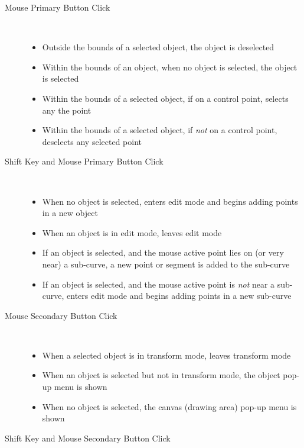 		\begin{description}
		  \item[Mouse Primary Button Click] \hfill \\
		    \begin{itemize}
		      \item Outside the bounds of a selected object, the
		        object is deselected
		      \item Within the bounds of an object, when no object
		        is selected, the object is selected
		      \item Within the bounds of a selected object,
		        if on a control point, selects any the point
		      \item Within the bounds of a selected object,
		        if \emph{not} on a control point,
		        deselects any selected point
		    \end{itemize}
		  \item[Shift Key and Mouse Primary Button Click] \hfill \\
		    \begin{itemize}
		      \item When no
		        object is selected, enters edit mode and
		        begins adding points in a
		        new object
		      \item When an
		        object is in edit mode,
		        leaves edit mode
		      \item If an object is selected, and the mouse active
		        point lies on (or very near) a sub-curve, a
		        new point or segment is added to the sub-curve
		      \item If an object is selected, and the mouse active
		        point is \emph{not} near a sub-curve, enters edit mode
		        and begins adding points in a new sub-curve
		    \end{itemize}
		  \item[Mouse Secondary Button Click] \hfill \\
		    \begin{itemize}
		      \item When a selected object is in transform mode,
		        leaves transform mode
		      \item When an object is selected but not in
		        transform mode, the object pop-up menu is shown
		      \item When no object is selected,
		        the canvas (drawing area) pop-up menu is shown
		    \end{itemize}
		  \item[Shift Key and Mouse Secondary Button Click] \hfill \\

\end{description}
